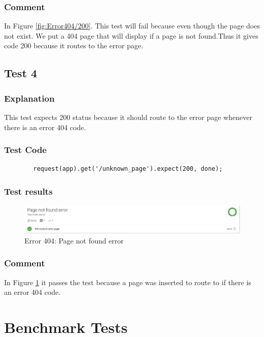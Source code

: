 \documentclass[]{article}
\begin{document}
		\subsubsection{Comment}
		In Figure \ref{fig:Error404/200}. This test will fail because even though the page does not exist. We put a 404  page that will display if a page is not found.Thus it gives code 200 because it routes to the error page.
	
	\subsection{Test 4}
	\subsubsection{Explanation}
		This test expects 200 status because it should route to the error page whenever there is an error 404 code.
	\subsubsection{Test Code}	
		\begin{verbatim}
		request(app).get('/unknown_page').expect(200, done);
		\end{verbatim}
	\subsubsection{Test results}
		\begin{figure}[h]
			\centering
		    \includegraphics[width=1\linewidth]{Graphics/MochaTest4.JPG}
			\caption{Error 404: Page not found error}
			\label{fig:Error404}\selectfont
	 	\end{figure}
	
	\subsubsection{Comment} 
	In Figure \ref{fig:Error404} it passes the test because a page was inserted to route to if there is an error 404 code.
	
\section{Benchmark Tests}
\end{document}
